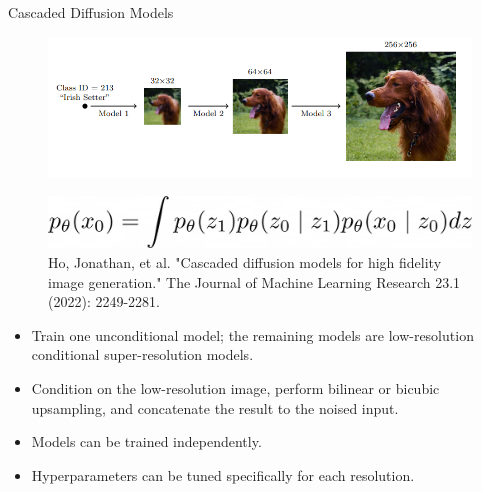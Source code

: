 \begin{frame}[allowframebreaks]{Cascaded Diffusion Models}
    \begin{figure}
        \centering
        \includegraphics[width=1.06\linewidth,height=\textheight,keepaspectratio]{images/adv-img-gen/slide_102_1_img.png}
    \end{figure}
    \begin{figure}
        \centering
        \includegraphics[width=0.8\linewidth,height=\textheight,keepaspectratio]{images/adv-img-gen/slide_102_2_img.png}
        \caption*{Ho, Jonathan, et al. "Cascaded diffusion models for high fidelity image generation." The Journal of Machine Learning Research 23.1 (2022): 2249-2281.}
    \end{figure}

    \framebreak

    \begin{itemize}
        \item Train one unconditional model; the remaining models are low-resolution conditional super-resolution models.
        \item Condition on the low-resolution image, perform bilinear or bicubic upsampling, and concatenate the result to the noised input.
        \item Models can be trained independently.
        \item Hyperparameters can be tuned specifically for each resolution.
    \end{itemize}

    \framebreak


\end{frame}
